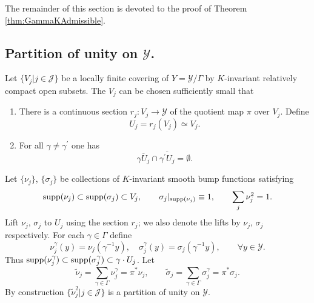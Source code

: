 \documentclass[11pt,reqno]{amsart}
\theoremstyle{definition}
\theoremstyle{remark}
\newcommand{\ti}[1]{\widetilde{#1}}
\def\Y{\ensuremath{\mathcal{Y}}}
\def\J{\ensuremath{\mathcal{J}}}
\def\supp{\ensuremath{\textnormal{supp}}}
\begin{document}
The remainder of this section is devoted to the proof of Theorem \ref{thm:GammaKAdmissible}.

\subsection{Partition of unity on $\Y$.}\label{sec:PartUnity}
Let $\{V_j|j \in \J\}$ be a locally finite covering of $Y=\Y/\Gamma$ by $K$-invariant relatively compact open subsets.  The $V_j$ can be chosen sufficiently small that
\begin{enumerate}
\item There is a continuous section $r_j\colon V_j \rightarrow \Y$ of the quotient map $\pi$ over $V_j$.  Define 
\[ U_j=r_j(V_j) \simeq V_j.\]
\item For all $\gamma \ne \gamma^\prime$ one has
\[ \overline{\gamma U_j} \cap \overline{\gamma^\prime U_j}=\emptyset.\]
\end{enumerate}

Let $\{\nu_j \}$, $\{\sigma_j \}$ be collections of $K$-invariant smooth bump functions satisfying
\[ \supp(\nu_j) \subset \supp(\sigma_j) \subset V_j, \qquad \sigma_j|_{\supp(\nu_j)} \equiv 1, \qquad \sum_j \nu_j^2=1. \] 
Lift $\nu_j$, $\sigma_j$ to $U_j$ using the section $r_j$; we also denote the lifts by $\nu_j$, $\sigma_j$ respectively.  For each $\gamma \in \Gamma$ define
\[ \nu_j^\gamma(y)=\nu_j(\gamma^{-1}y), \quad \sigma_j^\gamma(y)=\sigma_j(\gamma^{-1}y), \qquad \forall y \in \Y.\]
Thus $\supp(\nu_j^\gamma) \subset \supp(\sigma_j^\gamma) \subset \gamma \cdot U_j$.  Let
\[ \ti{\nu}_j=\sum_{\gamma \in \Gamma} \nu_j^{\gamma}=\pi^\ast \nu_j, \qquad \ti{\sigma}_j=\sum_{\gamma \in \Gamma} \sigma_j^{\gamma}=\pi^\ast \sigma_j.\]
By construction $\{\ti{\nu}_j^2|j \in \J \}$ is a partition of unity on $\Y$.
\end{document}
